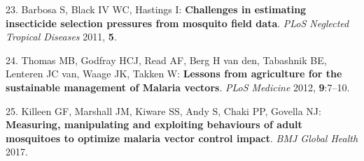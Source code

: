 \documentclass[11pt,]{article}
\begin{document}
\hypertarget{ref-Barbosa2011}{}
23. Barbosa S, Black IV WC, Hastings I: \textbf{Challenges in estimating
insecticide selection pressures from mosquito field data}. \emph{PLoS
Neglected Tropical Diseases} 2011, \textbf{5}.

\hypertarget{ref-Thomas2012}{}
24. Thomas MB, Godfray HCJ, Read AF, Berg H van den, Tabashnik BE,
Lenteren JC van, Waage JK, Takken W: \textbf{Lessons from agriculture
for the sustainable management of Malaria vectors}. \emph{PLoS Medicine}
2012, \textbf{9}:7--10.

\hypertarget{ref-Killeen2017}{}
25. Killeen GF, Marshall JM, Kiware SS, Andy S, Chaki PP, Govella NJ:
\textbf{Measuring, manipulating and exploiting behaviours of adult
mosquitoes to optimize malaria vector control impact}. \emph{BMJ Global
Health} 2017.
\end{document}
